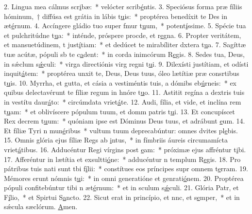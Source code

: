 2. Lingua mea cálmus scr\uline{i}bæ:~* velócter scrib\uline{é}ntis.
3. Speciósus forma præ fíliis hóminum,~† diffúsa est grátia in lábis t\uline{u}is:~* proptérea benedíxit te Des in æt\uline{é}rnum.
4. Accíngere gládio tuo super fmur t\uline{u}um,~* potent\uline{í}ssime.
5. Spécie tua et pulchritúdne t\uline{u}a:~* inténde, próspere procde, et r\uline{e}gna.
6. Propter veritátem, et mansuetúdinem, t just\uline{í}tiam:~* et dedúcet te mirabíliter dxtera t\uline{u}a.
7. Sagíttæ tuæ acútæ, pópuli sb te c\uline{a}dent:~* in corda inimcórum R\uline{e}gis.
8. Sedes tua, Deus, in sǽclum s\uline{ǽ}culi:~* virga directiónis virg regni t\uline{u}i.
9. Dilexísti justítiam, et odísti inquit\uline{á}tem:~* proptérea unxit te, Deus, Deus tuus, óleo lætítiæ præ consrtibus t\uline{u}is.
10. Myrrha, et gutta, et cásia a vestiméntis tuis, a dómibs eb\uline{ú}rneis:~* ex quibus delectavérunt te fíliæ regum in hnóre t\uline{u}o.
11. Astitit regína a dextris tuis in vestítu daur\uline{á}to:~* circúmdata vriet\uline{á}te.
12. Audi, fília, et vide, et inclína rem t\uline{u}am:~* et oblivíscere pópulum tuum, et domm patris t\uline{u}i.
13. Et concupíscet Rex decrem t\uline{u}um:~* quóniam ipse est Dóminus Deus tuus, et adrábunt \uline{e}um.
14. Et fíliæ Tyri n mun\uline{é}ribus~* vultum tuum deprecabúntur: omnes dvites pl\uline{e}bis.
15. Omnis glória ejus fíliæ Regs ab \uline{i}ntus,~* in fímbriis áureis circumamícta vriet\uline{á}tibus.
16. Adducéntur Regi vírgins post \uline{e}am:~* próximæ ejus affréntur t\uline{i}bi.
17. Afferéntur in lætítia et exsultti\uline{ó}ne:~* adducéntur n templum R\uline{e}gis.
18. Pro pátribus tuis nati sunt tbi f\uline{í}lii:~* constítues eos príncipes supr omnem t\uline{e}rram.
19. Mémores erunt nómnis t\uline{u}i:~* in omni generatióne et genrati\uline{ó}nem.
20. Proptérea pópuli confitebúntur tibi n æt\uline{é}rnum:~* et in sculum s\uline{ǽ}culi.
21. Glória Patr, et F\uline{í}lio,~* et Spirtui S\uline{a}ncto.
22. Sicut erat in princípio, et nnc, et s\uline{e}mper,~* et in sǽcula sæclórum. \uline{A}men.
